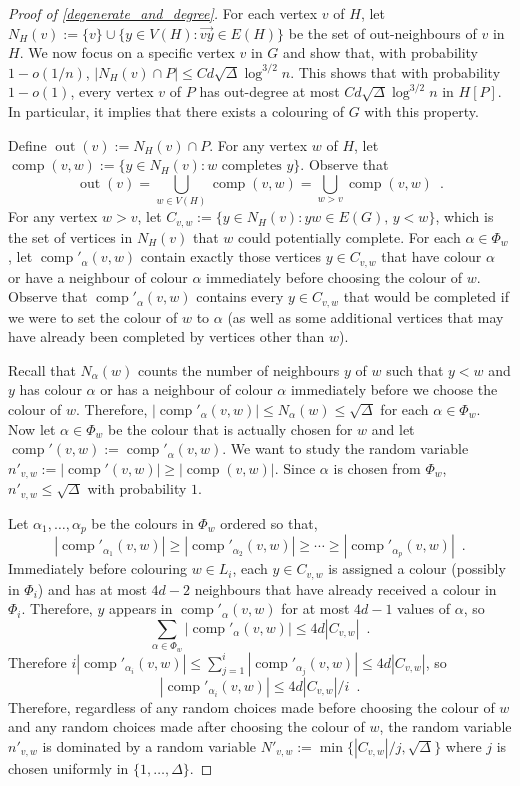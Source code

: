 \documentclass{patmorin}
\DeclareMathOperator{\outn}{out}
\DeclareMathOperator{\comp}{comp}
\begin{document}
\begin{proof}[Proof of \cref{degenerate_and_degree}]
  For each vertex $v$ of $H$, let $N_H(v):=\{v\}\cup \{y\in V(H): \overrightarrow{vy}\in E(H)\}$ be the set of out-neighbours of $v$ in $H$.  We now focus on a specific vertex $v$ in $G$ and show that, with probability $1-o(1/n)$, $|N_H(v)\cap P|\le Cd\sqrt{\Delta}\log^{3/2}  n$.  This shows that with probability $1-o(1)$, every vertex $v$ of $P$ has out-degree at most $Cd\sqrt{\Delta}\log^{3/2} n$ in $H[P]$.  In particular, it implies that there exists a colouring of $G$ with this property.

   Define $\outn(v):=N_H(v)\cap P$. For any vertex $w$ of $H$, let $\comp(v,w):=\{y\in N_H(v):\text{$w$ completes $y$}\}$.  Observe that
  \[
    \outn(v) = \bigcup_{w\in V(H)} \comp(v,w) = \bigcup_{w>v} \comp(v,w) \enspace .
  \]
  For any vertex $w>v$, let $C_{v,w}:=\{y\in N_H(v): yw\in E(G),\, y < w\}$, which is the set of vertices in $N_H(v)$ that $w$ could potentially complete.  For each $\alpha\in\Phi_w$, let $\comp'_\alpha(v,w)$ contain exactly those vertices $y\in C_{v,w}$ that have colour $\alpha$ or have a neighbour of colour $\alpha$ immediately before choosing the colour of $w$.  Observe that $\comp'_\alpha(v,w)$ contains every $y\in C_{v,w}$ that would be completed if we were to set the colour of $w$ to $\alpha$ (as well as some additional vertices that may have already been completed by vertices other than $w$).

  Recall that $N_\alpha(w)$ counts the number of neighbours $y$ of $w$ such that $y < w$ and $y$ has colour $\alpha$ or has a neighbour of colour $\alpha$ immediately before we choose the colour of $w$.  Therefore,  $|\comp'_\alpha(v,w)|\le N_\alpha(w)\le \sqrt{\Delta}$ for each $\alpha\in\Phi_w$.  Now let $\alpha\in\Phi_w$ be the colour that is actually chosen for $w$ and let $\comp'(v,w):=\comp'_\alpha(v,w)$.  We want to study the random variable $n'_{v,w}:=|\comp'(v,w)|\ge |\comp(v,w)|$.  Since $\alpha$ is chosen from $\Phi_w$, $n'_{v,w}\le\sqrt{\Delta}$ with probability $1$.

  Let $\alpha_1,\ldots,\alpha_p$ be the colours in $\Phi_w$ ordered so that,
  \[
    |\comp'_{\alpha_1}(v,w)|\ge|\comp'_{\alpha_2}(v,w)|\ge\cdots\ge |\comp'_{\alpha_p}(v,w)| \enspace .
  \]
  Immediately before colouring $w\in L_i$, each $y\in C_{v,w}$ is assigned a colour (possibly in $\Phi_i$) and has at most $4d-2$ neighbours that have already received a colour in $\Phi_i$.  Therefore, $y$ appears in
  $\comp'_{\alpha}(v,w)$ for at most $4d-1$ values of $\alpha$, so
  \[
    \sum_{\alpha\in\Phi_w} |\comp'_{\alpha}(v,w)| \le 4d| C_{v,w}| \enspace .
  \]
  Therefore $i|\comp'_{\alpha_i}(v,w)|\le\sum_{j=1}^i|\comp'_{\alpha_j}(v,w)|\le 4d|C_{v,w}|$, so
  \[
    |\comp'_{\alpha_i}(v,w)|\le 4d|C_{v,w}|/i \enspace .
  \]
  Therefore, regardless of any random choices made before choosing the colour of $w$ and any random choices made after choosing the colour of $w$, the random variable $n'_{v,w}$ is dominated by a random variable $N'_{v,w}:=\min\{|C_{v,w}|/j,\sqrt{\Delta}\}$ where $j$ is chosen uniformly in $\{1,\ldots,\Delta\}$.


\end{proof}
\end{document}
